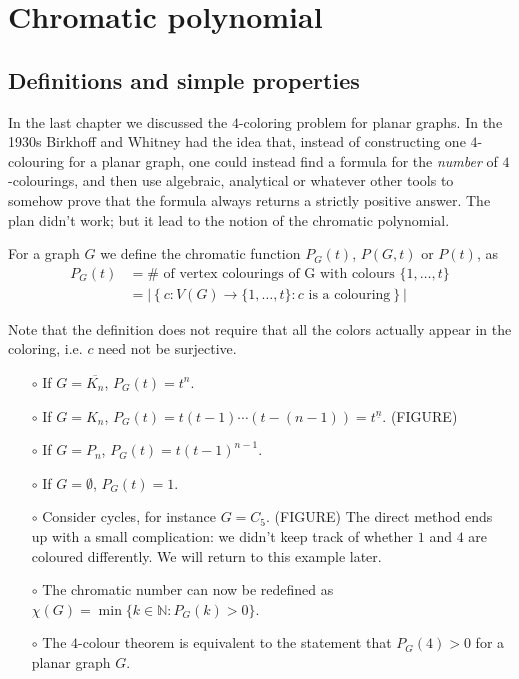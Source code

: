 \chapter{Chromatic polynomial}

\section{Definitions and simple properties}

In the last chapter we discussed the $4$-coloring problem for planar graphs. In the 1930s Birkhoff and Whitney had the idea that, instead of constructing one $4$-colouring for a planar graph, one could instead find a formula for the \emph{number} of $4$-colourings, and then use algebraic, analytical or whatever other tools to somehow prove that the formula always returns a strictly positive answer. The plan didn't work; but it lead to the notion of the chromatic polynomial.

\begin{definition} For a graph $G$ we define the chromatic function $P_G(t)$, $P(G,t)$ or $P(t)$, as 
\begin{align*}
P_G(t)&=\#\text{ of vertex colourings of G with colours }\lbrace 1,\dots ,t\rbrace\\
&=\left|\left\lbrace c:V(G)\to \lbrace 1,\dots ,t\rbrace : c\text{ is a colouring}\right\rbrace\right|
\end{align*}
\end{definition}

Note that the definition does not require that all the colors actually appear in the coloring, i.e. $c$ need not be surjective.

\begin{example}
\begin{enumerate}
\item[$\circ$] If $G=\overline{K_n}$, $P_G(t)=t^n$.
\item[$\circ$] If $G=K_n$, $P_G(t)=t(t-1) \cdots (t-(n-1))=t^{\underline{n}}$. (FIGURE)
\item[$\circ$] If $G=P_n$, $P_G(t)=t(t-1)^{n-1}$.
\item[$\circ$] If $G=\emptyset$, $P_G(t)=1$.
\item[$\circ$] Consider cycles, for instance $G=C_5$. (FIGURE) The direct method ends up with a small complication: we didn't keep track of whether $1$ and $4$ are coloured differently. We will return to this example later.
\item[$\circ$] The chromatic number can now be redefined as $\chi(G)=\min \lbrace k\in\mathbb{N} : P_G(k)>0\rbrace$.
\item[$\circ$] The $4$-colour theorem is equivalent to the statement that $P_G(4)>0$ for a planar graph $G$.
\end{enumerate}
\end{example}

